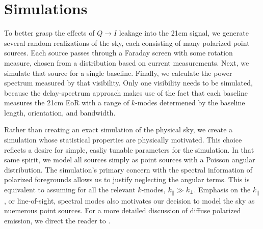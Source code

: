 \chapter{Simulations}
\label{chap:Simulations}

To better grasp the effects of $Q\to I$ leakage into the 21cm signal, we generate several
random realizations of the sky, each consisting of many polarized point sources. Each source passes
through a Faraday screen with some rotation measure, chosen from a distribution based on current
measurements. Next, we simulate that source for a single baseline. Finally, we calculate the power
spectrum measured by that visibility. Only one visibility needs to be simulated, because the
delay-spectrum approach makes use of the fact that each baseline measures the 21cm EoR with a range
of $k$-modes determened by the baseline length, orientation, and bandwidth.

Rather than creating an exact simulation of the physical sky, we create a simulation whose
statistical properties are physically motivated. This choice reflects a desire for simple, easliy
tunable parameters for the simulation. In that same spirit, we model all sources simply as point
sources with a Poisson angular distribution. The simulation's primary concern  with the spectral information
of polarized foregrounds allows us to justify neglecting the angular terms. This is equivalent to
assuming for all the relevant $k$-modes, $k_{||} \gg k_{\perp}$. Emphasis on the $k_{||}$, or
line-of-sight, spectral modes also motivates our decision to model the sky as nuemerous point
sources. For a more detailed discussion of diffuse polarized emission, we direct the reader to
\citet{Jelic2010}.





